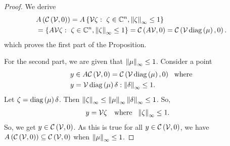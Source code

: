 \begin{proof}
We derive
\begin{align*}
& A\lt(\cztope{\ptemp}{0}\rt) =
A\set{\ptemp\zeta:~\zeta\in\compnums^n,\infnorm{\zeta}\leq 1}\\
& =\set{A\ptemp\zeta:~\zeta\in\compnums^n,\infnorm{\zeta}\leq 1}
= \cztope{A\ptemp}{0}=\cztope{\ptemp\diagonal{\mu}}{0}.
\end{align*}
%
which proves the first part of the
Proposition.

For the second part, we are given that $\infnorm{\mu}\leq 1$.
Consider a point
%
\begin{align*}
  & y\in A\cztope{\ptemp}{0}=\cztope{\ptemp\diagonal{\mu}}{0}~~\text{where}\\
  &y = \ptemp\diagonal{\mu}\delta:\infnorm{\delta}\leq
1.
\end{align*}
%
Let $\zeta = \diagonal{\mu}\delta$. Then $\infnorm{\zeta} \leq
\infnorm{\mu}\infnorm{\delta} \leq 1$.  So,
%
\begin{align*}
  & y=\ptemp\zeta~~\text{ where }~
  \infnorm{\zeta}\leq 1.
\end{align*}
%
So, we get $y\in \cztope{\ptemp}{0}$.  As this is true for all
$y\in\cztope{\ptemp}{0}$, we have
$A\lt(\cztope{\ptemp}{0}\rt)\subseteq
\cztope{\ptemp}{0}$ when $\infnorm{\mu}\leq 1$.
\end{proof}
%




